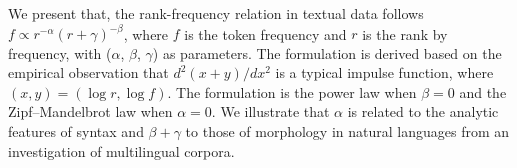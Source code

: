 We present that, the rank-frequency relation in textual data follows $f \propto r^{-\alpha}(r+\gamma)^{-\beta}$, where $f$ is the token frequency and $r$ is the rank by frequency, with ($\alpha$, $\beta$, $\gamma$) as parameters. The formulation is derived based on the empirical observation that $d^2 (x+y)/dx^2$ is a typical impulse function, where $(x,y)=(\log r, \log f)$. The formulation is the power law when \mbox{$\beta=0$} and the Zipf--Mandelbrot law when \mbox{$\alpha=0$}. We illustrate that $\alpha$ is related to the analytic features of syntax and $\beta+\gamma$ to those of morphology in natural languages from an investigation of multilingual corpora.
